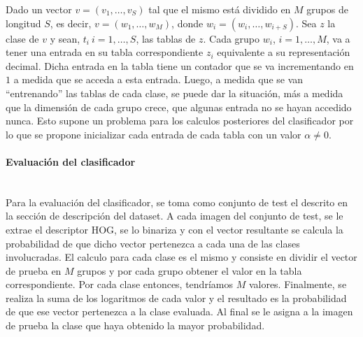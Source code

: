 			Dado un vector $v=(v_1, \dots, v_S)$  tal que el mismo está dividido en $M$ grupos de longitud $S$, es decir, $v=(w_1,\dots,w_M)$, donde $w_i=(w_i,\dots,w_{i+S})$. Sea $z$ la clase de $v$ y sean, $t_i~ i=1, \dots, S$, las tablas de $z$. Cada grupo $w_i$, $i=1, \dots, M$, va a tener una entrada en su tabla correspondiente $z_i$ equivalente a su representación decimal. Dicha entrada en la tabla tiene un contador que se va incrementando en $1$ a medida que se acceda a esta entrada. Luego, a medida que se van ``entrenando'' las tablas de cada clase, se puede dar la situación, más a medida que la dimensión de cada grupo crece, que algunas entrada no se hayan accedido nunca. Esto supone un problema para los calculos posteriores del clasificador por lo que se propone inicializar cada entrada de cada tabla con un valor $\alpha \neq 0$. 

		\paragraph{Evaluación del clasificador} ~\\

			Para la evaluación del clasificador, se toma como conjunto de test el descrito en la sección de descripción del dataset. A cada imagen del conjunto de test, se le extrae el descriptor HOG, se lo binariza y con el vector resultante se calcula la probabilidad de que dicho vector pertenezca a cada una de las clases involucradas. El calculo para cada clase es el mismo y consiste en dividir el vector de prueba en $M$ grupos y por cada grupo obtener el valor en la tabla correspondiente. Por cada clase entonces, tendríamos $M$ valores. Finalmente, se realiza la suma de los logaritmos de cada valor y el resultado es la probabilidad de que ese vector pertenezca a la clase evaluada. Al final se le asigna a la imagen de prueba la clase que haya obtenido la mayor probabilidad.

